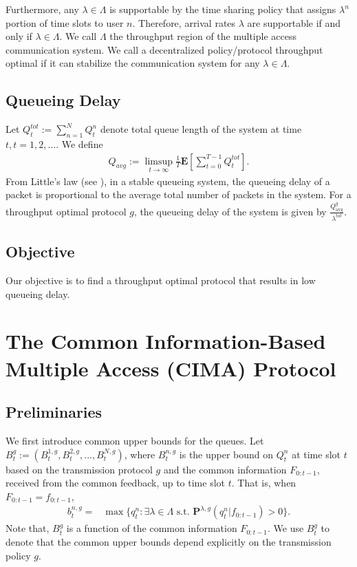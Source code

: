 \documentclass[onecolumn,draftcls]{IEEEtran}
\begin{document}
Furthermore, any $\lambda \in \Lambda$ is supportable by the time sharing policy that assigns $\lambda^n$ portion of time slots to user $n$. 
Therefore, arrival rates $\lambda$ are supportable if and only if $\lambda \in \Lambda$. We call $\Lambda$ the throughput region of the multiple access communication system.
We call a decentralized policy/protocol throughput optimal if it can stabilize the communication system for any $\lambda \in \Lambda$. 



\subsection{Queueing Delay} \label{sub:model:delay}
Let $Q^{tot}_t:= \sum_{n=1}^N Q^n_t$ denote total queue length of the system at time $t, t=1,2,\dots$.
We define
\begin{align}
Q_{avg}
:= \limsup_{t\rightarrow\infty} \frac{1}{T} \mathbf{E}\left[\sum_{t=0}^{T-1}Q^{tot}_t\right].
\end{align}
From Little's law (see \cite{bertsekas1992data}), 
in a stable queueing system, the queueing delay of a packet is proportional to the average total number of packets in the system. 
For a throughput optimal protocol $g$, the queueing delay of the system is given by $\frac{Q^g_{\text{avg}}}{\lambda^{tot}} $.

\subsection{Objective}
Our objective is to find a throughput optimal protocol that results in low queueing delay.


\section{The Common Information-Based Multiple Access (CIMA) Protocol}
\label{sec:CIMA}
\subsection{Preliminaries}
We first introduce common upper bounds for the queues.
Let $B^g_t := (B^{1,g}_t,B^{2,g}_t,\dots,B^{N,g}_t)$, where
$B^{n,g}_t$ is the upper bound on $Q^n_t$ at time slot $t$ based on the transmission protocol $g$ and the common information $F_{0:t-1}$, received from the common feedback, up to time slot $t$.
That is, when $F_{0:t-1}=f_{0:t-1}$,
\begin{align*}
b^{n,g}_t = 
&\max \{q^n_t: \exists\lambda\in \Lambda \text{ s.t. } \mathbf{P}^{\lambda,g}(q^n_t|f_{0:t-1}) >0\}.
\end{align*}
Note that, $B^g_t$ is a function of the common information $F_{0:t-1}$. We use $B^{g}_t$ to denote that the common upper bounds depend explicitly on the transmission policy $g$.
\end{document}
